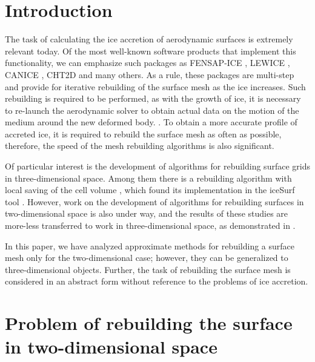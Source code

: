 \documentclass[
11pt,%
tightenlines,%
twoside,%
onecolumn,%
nofloats,%
nobibnotes,%
nofootinbib,%
superscriptaddress,%
noshowpacs,%
centertags]%
{revtex4}
\begin{document}

\maketitle


\section{Introduction}

The task of calculating the ice accretion of aerodynamic surfaces is extremely relevant today.
Of the most well-known software products that implement this functionality, we can emphasize such packages as FENSAP-ICE \cite{Bourgault_FENSAP}, LEWICE \cite{Bidwell_LEWICE}, CANICE \cite{Pueyo_CANICE}, CHT2D \cite{Pueyo_CHT2D} and many others.
As a rule, these packages are multi-step and provide for iterative rebuilding of the surface mesh as the ice increases.
Such rebuilding is required to be performed, as with the growth of ice, it is necessary to re-launch the aerodynamic solver to obtain actual data on the motion of the medium around the new deformed body. \cite{Ozgen, Beaugendre}.
To obtain a more accurate profile of accreted ice, it is required to rebuild the surface mesh as often as possible, therefore, the speed of the mesh rebuilding algorithms is also significant.

Of particular interest is the development of algorithms for rebuilding surface grids in three-dimensional space.
Among them there is a rebuilding algorithm with local saving of the cell volume \cite{Jiao}, which found its implementation in the iceSurf tool \cite{Thompson}.
However, work on the development of algorithms for rebuilding surfaces in two-dimensional space is also under way, and the results of these studies are more-less transferred to work in three-dimensional space, as demonstrated in \cite{Pueyo}.

In this paper, we have analyzed approximate methods for rebuilding a surface mesh only for the two-dimensional case; however, they can be generalized to three-dimensional objects.
Further, the task of rebuilding the surface mesh is considered in an abstract form without reference to the problems of ice accretion.

\section{Problem of rebuilding the surface in two-dimensional space}
\end{document}

